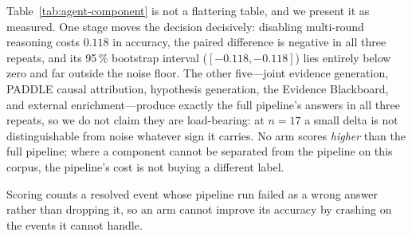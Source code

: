 Table~\ref{tab:agent-component} is not a flattering table, and we present
it as measured. One stage moves the decision decisively: disabling
multi-round reasoning costs $0.118$ in accuracy, the paired difference is
negative in all three repeats, and its 95\,\% bootstrap interval
($[-0.118,-0.118]$) lies entirely below zero and far outside the noise
floor. The other five---joint evidence generation, PADDLE causal
attribution, hypothesis generation, the Evidence Blackboard, and external
enrichment---produce exactly the full pipeline's answers in all three
repeats, so we do not claim they are load-bearing: at $n=17$ a small
delta is not distinguishable from noise whatever sign it carries. No arm
scores \emph{higher} than the full pipeline; where a component cannot be
separated from the pipeline on this corpus, the pipeline's cost is not
buying a different label.

Scoring counts a resolved event whose pipeline run failed as a wrong
answer rather than dropping it, so an arm cannot improve its accuracy by
crashing on the events it cannot handle.

